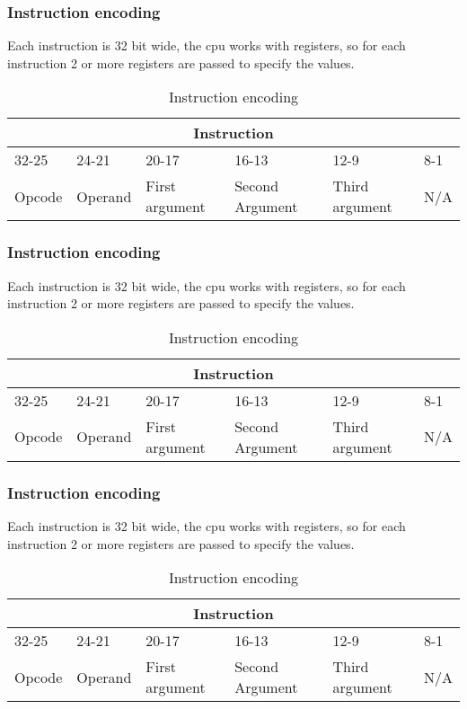 \documentclass{article}
\begin{document}
\subsubsection{Instruction encoding}
Each instruction is 32 bit wide, the cpu works with registers, so for each instruction 2 or more registers are passed to specify the values.
\begin{table}[h!]
\centering
\begin{tabular} { | p{2cm} | | p{2cm} | p{3cm} | | p{3cm} | | p{3cm}| | p{3cm} |}
  \hline
  \multicolumn{6}{|c|}{Instruction}\\
  \hline
  32-25 & 24-21 & 20-17 & 16-13 & 12-9 & 8-1\\
  \hline
  Opcode & Operand & First argument & Second Argument & Third argument & N/A\\
  \hline
\end{tabular}
\caption{Instruction encoding}
\end{table}
\subsubsection{Instruction encoding}
Each instruction is 32 bit wide, the cpu works with registers, so for each instruction 2 or more registers are passed to specify the values.
\begin{table}[h!]
\centering
\begin{tabular} { | p{2cm} | | p{2cm} | p{3cm} | | p{3cm} | | p{3cm}| | p{3cm} |}
  \hline
  \multicolumn{6}{|c|}{Instruction}\\
  \hline
  32-25 & 24-21 & 20-17 & 16-13 & 12-9 & 8-1\\
  \hline
  Opcode & Operand & First argument & Second Argument & Third argument & N/A\\
  \hline
\end{tabular}
\caption{Instruction encoding}
\end{table}
\subsubsection{Instruction encoding}
Each instruction is 32 bit wide, the cpu works with registers, so for each instruction 2 or more registers are passed to specify the values.
\begin{table}[h!]
\centering
\begin{tabular} { | p{2cm} | | p{2cm} | p{3cm} | | p{3cm} | | p{3cm}| | p{3cm} |}
  \hline
  \multicolumn{6}{|c|}{Instruction}\\
  \hline
  32-25 & 24-21 & 20-17 & 16-13 & 12-9 & 8-1\\
  \hline
  Opcode & Operand & First argument & Second Argument & Third argument & N/A\\
  \hline
\end{tabular}
\caption{Instruction encoding}
\end{table}
\end{document}

